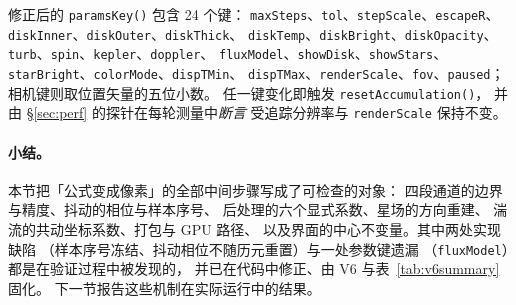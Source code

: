 \noindent
修正后的 \texttt{paramsKey()} 包含 24 个键：
\texttt{maxSteps}、\texttt{tol}、\texttt{stepScale}、\texttt{escapeR}、
\texttt{diskInner}、\texttt{diskOuter}、\texttt{diskThick}、
\texttt{diskTemp}、\texttt{diskBright}、\texttt{diskOpacity}、
\texttt{turb}、\texttt{spin}、\texttt{kepler}、\texttt{doppler}、
\texttt{fluxModel}、\texttt{showDisk}、\texttt{showStars}、
\texttt{starBright}、\texttt{colorMode}、\texttt{dispTMin}、
\texttt{dispTMax}、\texttt{renderScale}、\texttt{fov}、\texttt{paused}；
相机键则取位置矢量的五位小数。
任一键变化即触发 \texttt{resetAccumulation()}，
并由 §\ref{sec:perf} 的探针在每轮测量中\emph{断言}
受追踪分辨率与 \texttt{renderScale} 保持不变。

\paragraph{小结。}
本节把「公式变成像素」的全部中间步骤写成了可检查的对象：
四段通道的边界与精度、抖动的相位与样本序号、
后处理的六个显式系数、星场的方向重建、
湍流的共动坐标系数、打包与 GPU 路径、
以及界面的中心不变量。其中两处实现缺陷
（样本序号冻结、抖动相位不随历元重置）与一处参数键遗漏
（\texttt{fluxModel}）都是在验证过程中被发现的，
并已在代码中修正、由 V6 与表~\ref{tab:v6summary} 固化。
下一节报告这些机制在实际运行中的结果。

